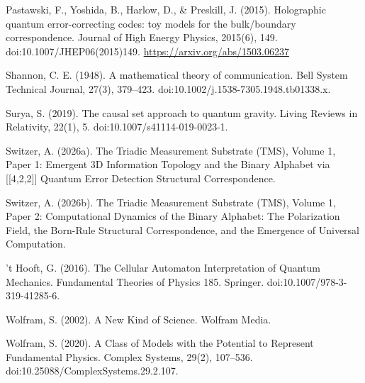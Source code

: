 \documentclass[11pt,oneside]{report}
\theoremstyle{definition}
\theoremstyle{remark}
\newenvironment{reflist}
  {\par\small\setlength{\parindent}{0pt}%
   \setlength{\leftskip}{1.6em}\setlength{\parindent}{-1.6em}%
   \setlength{\parskip}{0.4em}%
   \raggedright\hyphenpenalty=50\exhyphenpenalty=50\relax
   \sloppy}
  {\par}
\begin{document}
\begin{reflist}
Pastawski, F., Yoshida, B., Harlow, D., \& Preskill, J. (2015).
Holographic quantum error-correcting codes: toy models for the
bulk/boundary correspondence. Journal of High Energy Physics, 2015(6),
149. doi:10.1007/JHEP06(2015)149. \url{https://arxiv.org/abs/1503.06237}

Shannon, C. E. (1948). A mathematical theory of communication. Bell
System Technical Journal, 27(3), 379--423.
doi:10.1002/j.1538-7305.1948.tb01338.x.

Surya, S. (2019). The causal set approach to quantum gravity. Living
Reviews in Relativity, 22(1), 5. doi:10.1007/s41114-019-0023-1.

Switzer, A. (2026a). The Triadic Measurement Substrate (TMS), Volume 1,
Paper 1: Emergent 3D Information Topology and the Binary Alphabet via
[[4,2,2]] Quantum Error Detection Structural Correspondence.

Switzer, A. (2026b). The Triadic Measurement Substrate (TMS), Volume 1,
Paper 2: Computational Dynamics of the Binary Alphabet: The Polarization
Field, the Born-Rule Structural Correspondence, and the Emergence of
Universal Computation.

't Hooft, G. (2016). The Cellular Automaton Interpretation of Quantum
Mechanics. Fundamental Theories of Physics 185. Springer.
doi:10.1007/978-3-319-41285-6.

Wolfram, S. (2002). A New Kind of Science. Wolfram Media.

Wolfram, S. (2020). A Class of Models with the Potential to Represent
Fundamental Physics. Complex Systems, 29(2), 107--536.
doi:10.25088/ComplexSystems.29.2.107.
\end{reflist}

\clearpage
\end{document}
